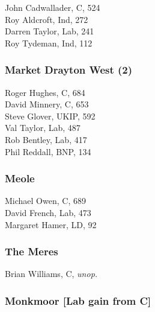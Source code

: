\documentclass[a4paper,openany,10pt]{book}
\begin{document}


John Cadwallader, C, 524\\
Roy Aldcroft, Ind, 272\\
Darren Taylor, Lab, 241\\
Roy Tydeman, Ind, 112\\


\subsubsection*{Market Drayton West (2)}



Roger Hughes, C, 684\\
David Minnery, C, 653\\
Steve Glover, UKIP, 592\\
Val Taylor, Lab, 487\\
Rob Bentley, Lab, 417\\
Phil Reddall, BNP, 134\\


\subsubsection*{Meole}



Michael Owen, C, 689\\
David French, Lab, 473\\
Margaret Hamer, LD, 92\\


\subsubsection*{The Meres}



Brian Williams, C, \emph{unop.}\\


\subsubsection*{Monkmoor \hspace*{\fill}\nolinebreak[1]%
\enspace\hspace*{\fill}
[Lab gain from C]}
\end{document}
